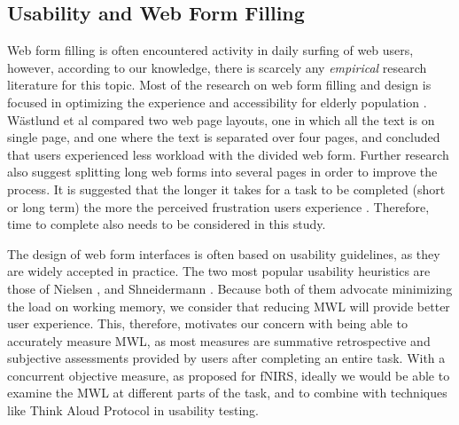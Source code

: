 \documentclass[../main/Feedback.tex]{subfiles}
\begin{document}
\subsection{Usability and Web Form Filling}	
Web form filling is often encountered activity in daily surfing of web users, however, according to our knowledge, there is scarcely any \emph{empirical} research literature for this topic.
Most of the research on web form filling and design is focused in optimizing the experience and accessibility for elderly population \cite{chadwick2003web,lines2006online,sayago2007some,sayago2012selective}.
W{\"a}stlund et al \cite{Wastlund20081229} compared two web page layouts, one in which all the text is on single page, and one where the text is separated over four pages, and concluded that users experienced less workload with the divided web form.
Further research \cite{jarrett2009forms,wroblewski2008web} also suggest splitting long web forms into several pages in order to improve the process.
It is suggested that the longer it takes for a task to be completed (short or long term) the more the perceived frustration users experience \cite{bessiere2004social,mendoza2005usability}.
Therefore, time to complete also needs to be considered in this study.

The design of web form interfaces is often based on usability guidelines, as they are widely accepted in practice.
The two most popular usability heuristics are those of Nielsen \cite{nielsen1990heuristic}, and Shneidermann \cite{shneiderman1992designing}.
Because both of them advocate minimizing the load on working memory, we consider that reducing MWL will provide better user experience. This, therefore, motivates our concern with being able to accurately measure MWL, as most measures are summative retrospective and subjective assessments provided by users after completing an entire task. With a concurrent objective measure, as proposed for fNIRS, ideally we would be able to examine the MWL at different parts of the task, and to combine with techniques like Think Aloud Protocol \cite{pike2014measuring} in usability testing.
\end{document}
